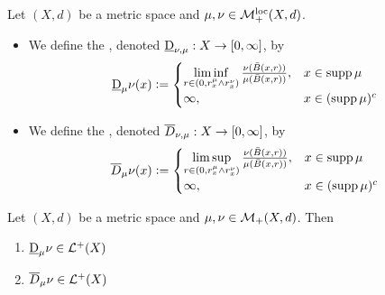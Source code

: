 \documentclass{book}
\begin{document}
	\begin{defn} 
		Let $(X, d)$ be a metric space and $\mu, \nu \in \mathcal{M}_+^{\text{loc}}(X,d)$. 
		\begin{itemize}
			\item We define the , denoted $\underbar{D}_{\nu, \mu}: X \rightarrow [0,\infty]$, by
			\[
			\underbar{D}_{\mu}\nu(x) \vcentcolon=
			\begin{cases}
				\liminf\limits_{r \in (0, r^{\mu}_x \wedge r^{\nu}_x)} \frac{\nu(\bar{B}(x, r))}{\mu(\bar{B}(x, r))}, & x \in \operatorname{supp} \mu \\
				\infty, & x \in (\operatorname{supp} \mu)^c  
			\end{cases}
			\]
			\item We define the , denoted $\overline{D}_{\nu, \mu}: X \rightarrow [0,\infty]$, by 
			\[
			\overline{D}_{\mu}\nu(x) \vcentcolon=
			\begin{cases}
				\limsup\limits_{r \in (0, r^{\mu}_x \wedge r^{\nu}_x)} \frac{\nu(\bar{B}(x, r))}{\mu(\bar{B}(x, r))}, & x \in \operatorname{supp} \mu \\
				\infty, & x \in (\operatorname{supp} \mu)^c    
			\end{cases}
			\]
		\end{itemize}
	\end{defn}
	
	\begin{ex}
		Let $(X, d)$ be a metric space and $\mu, \nu \in \mathcal{M}_+(X, d)$. Then 
		\begin{enumerate}
			\item $\underbar{D}_{\mu}\nu \in \mathcal{L}^+(X)$
			\item $\overline{D}_{\mu}\nu \in \mathcal{L}^+(X)$
		\end{enumerate}
	\end{ex}
	
\end{document}
